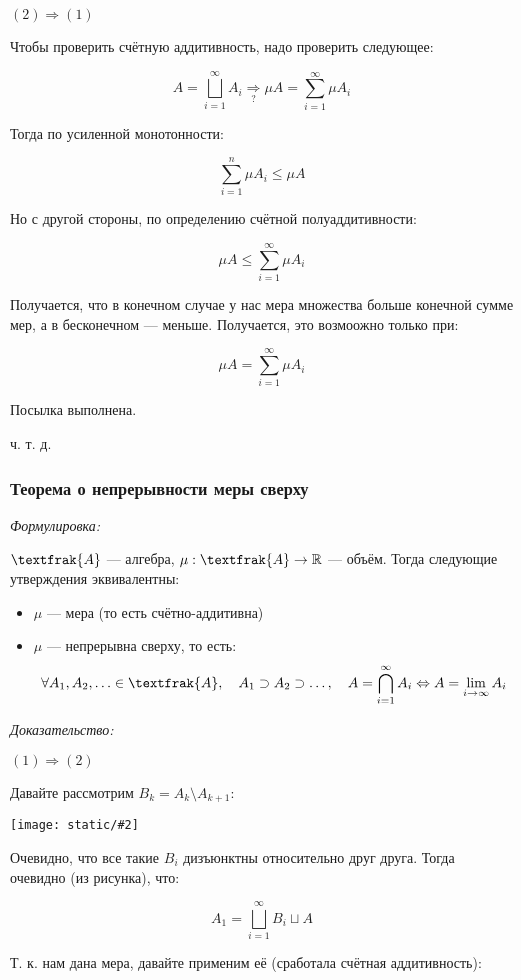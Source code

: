 \documentclass{article}
\def\images#1#2{\begin{center}\texttt{[image: static/\#2]}\end{center}}
\begin{document}
\textbf{$(2) \Rightarrow (1)$}

Чтобы проверить счётную аддитивность, надо проверить следующее:

\[A = \bigsqcup_{i = 1}^{\infty} A_i \underset{?}{\Rightarrow} \mu A = \sum_{i = 1}^{\infty} \mu A_i\]

Тогда по усиленной монотонности: 

\[\sum_{i = 1}^{n} \mu A_i \le \mu A\]

Но с другой стороны, по определению счётной полуаддитивности: 

\[\mu A \le \sum_{i = 1}^{\infty} \mu A_i\]

Получается, что в конечном случае у нас мера множества больше конечной сумме мер, а в бесконечном --- меньше. Получается, это возмоожно только при: 

\[\mu A = \sum_{i = 1}^{\infty} \mu A_i\]

Посылка выполнена. 

ч. т. д.


\subsubsection{Теорема о непрерывности меры сверху}

\textit{Формулировка:}

$\textfrak{A}$ --- алгебра, $\mu: \textfrak{A} \rightarrow \mathbb{R}$ --- объём. Тогда следующие утверждения эквивалентны: 

\begin{itemize}
    \item $\mu$ --- мера (то есть счётно-аддитивна)
    \item $\mu$ --- непрерывна сверху, то есть: 
    \[\forall A_1, A_2, \ldots \in \textfrak{A}, \quad A_1 \supset A_2 \supset \ldots, \quad A = \bigcap_{i = 1}^{\infty} A_i \Leftrightarrow A = \lim_{i \rightarrow \infty} A_i\]
\end{itemize}

\textit{Доказательство:}

\textbf{$(1) \Rightarrow (2)$}

Давайте рассмотрим $B_k = A_k \setminus A_{k + 1}$: 

\images{0.3}{nepr_mera_sv.png}

Очевидно, что все такие $B_i$ дизъюнктны относительно друг друга. Тогда очевидно (из рисунка), что:

\[A_1 = \bigsqcup_{i = 1}^{\infty} B_i \sqcup A\]

Т. к. нам дана мера, давайте применим её (сработала счётная аддитивность): 
\end{document}
